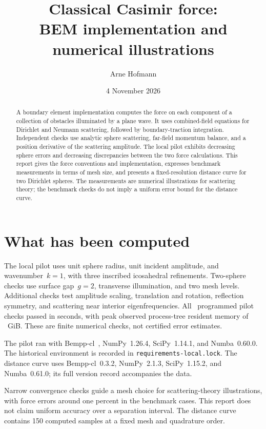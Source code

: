 \documentclass[11pt,a4paper]{article}
\title{Classical Casimir force:\\BEM implementation and numerical illustrations}
\author{Arne Hofmann}\date{4 November 2026}
\numberwithin{equation}{section}
\begin{document}
\maketitle
\begin{abstract}
A boundary element implementation computes the force on each component of a collection of obstacles illuminated by a plane wave. It uses combined-field equations for Dirichlet and Neumann scattering, followed by boundary-traction integration. Independent checks use analytic sphere scattering, far-field momentum balance, and a position derivative of the scattering amplitude. The local pilot exhibits decreasing sphere errors and decreasing discrepancies between the two force calculations. This report gives the force conventions and implementation, expresses benchmark measurements in terms of mesh size, and presents a fixed-resolution distance curve for two Dirichlet spheres. The measurements are numerical illustrations for scattering theory; the benchmark checks do not imply a uniform error bound for the distance curve.
\end{abstract}

\section{What has been computed}
The local pilot uses unit sphere radius, unit incident amplitude, and wavenumber~$k=1$, with three inscribed icosahedral refinements. Two-sphere checks use surface gap~$g=2$, transverse illumination, and two mesh levels. Additional checks test amplitude scaling, translation and rotation, reflection symmetry, and scattering near interior eigenfrequencies. All~\CheckCount{} programmed pilot checks passed in \PilotSeconds{} seconds, with peak observed process-tree resident memory of \PeakRSS{}~GiB. These are finite numerical checks, not certified error estimates.

The pilot ran with Bempp-cl~\BackendVersion{}, NumPy~1.26.4, SciPy~1.14.1, and Numba~0.60.0. The historical environment is recorded in \texttt{requirements-local.lock}. The distance curve uses Bempp-cl~0.3.2, NumPy~2.1.3, SciPy~1.15.2, and Numba~0.61.0; its full version record accompanies the data.

Narrow convergence checks guide a mesh choice for scattering-theory illustrations, with force errors around one percent in the benchmark cases. This report does not claim uniform accuracy over a separation interval. The distance curve contains 150 computed samples at a fixed mesh and quadrature order.
\end{document}
